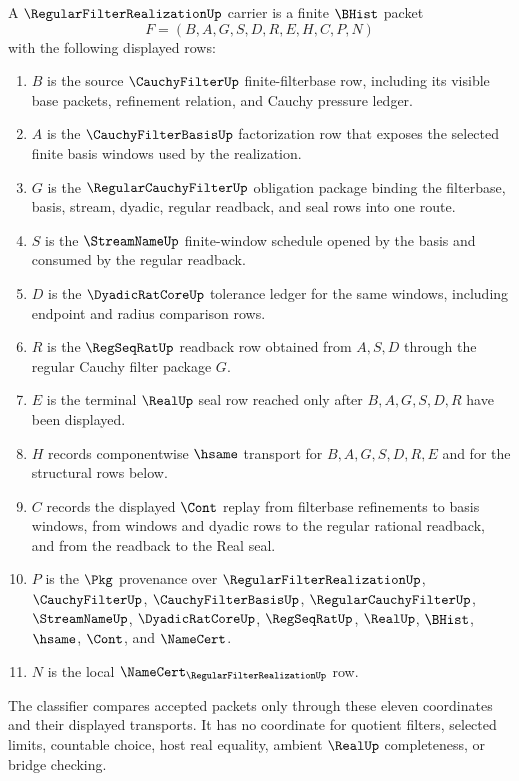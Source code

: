 \begin{definition}
\label{def:regular-filter-realization-carrier}
A $\RegularFilterRealizationUp$ carrier is a finite $\BHist$ packet
$$
F=(B,A,G,S,D,R,E,H,C,P,N)
$$
with the following displayed rows:
\begin{enumerate}
\item $B$ is the source $\CauchyFilterUp$ finite-filterbase row, including its visible base packets, refinement relation, and Cauchy pressure ledger.
\item $A$ is the $\CauchyFilterBasisUp$ factorization row that exposes the selected finite basis windows used by the realization.
\item $G$ is the $\RegularCauchyFilterUp$ obligation package binding the filterbase, basis, stream, dyadic, regular readback, and seal rows into one route.
\item $S$ is the $\StreamNameUp$ finite-window schedule opened by the basis and consumed by the regular readback.
\item $D$ is the $\DyadicRatCoreUp$ tolerance ledger for the same windows, including endpoint and radius comparison rows.
\item $R$ is the $\RegSeqRatUp$ readback row obtained from $A,S,D$ through the regular Cauchy filter package $G$.
\item $E$ is the terminal $\RealUp$ seal row reached only after $B,A,G,S,D,R$ have been displayed.
\item $H$ records componentwise $\hsame$ transport for $B,A,G,S,D,R,E$ and for the structural rows below.
\item $C$ records the displayed $\Cont$ replay from filterbase refinements to basis windows, from windows and dyadic rows to the regular rational readback, and from the readback to the Real seal.
\item $P$ is the $\Pkg$ provenance over $\RegularFilterRealizationUp$, $\CauchyFilterUp$, $\CauchyFilterBasisUp$, $\RegularCauchyFilterUp$, $\StreamNameUp$, $\DyadicRatCoreUp$, $\RegSeqRatUp$, $\RealUp$, $\BHist$, $\hsame$, $\Cont$, and $\NameCert$.
\item $N$ is the local $\NameCert_{\RegularFilterRealizationUp}$ row.
\end{enumerate}
The classifier compares accepted packets only through these eleven coordinates and their displayed transports. It has no coordinate for quotient filters, selected limits, countable choice, host real equality, ambient $\RealUp$ completeness, or bridge checking.
\end{definition}

